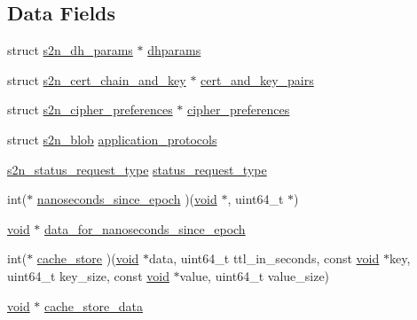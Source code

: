 \subsection*{Data Fields}
\begin{DoxyCompactItemize}
\item 
struct \hyperlink{structs2n__dh__params}{s2n\+\_\+dh\+\_\+params} $\ast$ \hyperlink{structs2n__config_abdbd12d9095df20e7e63ef00b353db7c}{dhparams}
\item 
struct \hyperlink{structs2n__cert__chain__and__key}{s2n\+\_\+cert\+\_\+chain\+\_\+and\+\_\+key} $\ast$ \hyperlink{structs2n__config_acd0d45f80129861144d237591eee6c5f}{cert\+\_\+and\+\_\+key\+\_\+pairs}
\item 
struct \hyperlink{structs2n__cipher__preferences}{s2n\+\_\+cipher\+\_\+preferences} $\ast$ \hyperlink{structs2n__config_a2cdf2a56849d48a020a71d6e8d03d9cf}{cipher\+\_\+preferences}
\item 
struct \hyperlink{structs2n__blob}{s2n\+\_\+blob} \hyperlink{structs2n__config_a45182f90f146494a0f2dc4c962bbba0e}{application\+\_\+protocols}
\item 
\hyperlink{s2n_8h_a7d38e45340d223d0100a2d4bc0526635}{s2n\+\_\+status\+\_\+request\+\_\+type} \hyperlink{structs2n__config_aa6c7e4f4cf13d4d133b66760cf0d09fa}{status\+\_\+request\+\_\+type}
\item 
int($\ast$ \hyperlink{structs2n__config_a5c13684f60b915be42223586e6c42e5c}{nanoseconds\+\_\+since\+\_\+epoch} )(\hyperlink{hw__4758__cca_8h_afad4d591c7931ff6dc5bf69c76c96aa0}{void} $\ast$, uint64\+\_\+t $\ast$)
\item 
\hyperlink{hw__4758__cca_8h_afad4d591c7931ff6dc5bf69c76c96aa0}{void} $\ast$ \hyperlink{structs2n__config_a462e69eaecd0176f077b385c9dd1477b}{data\+\_\+for\+\_\+nanoseconds\+\_\+since\+\_\+epoch}
\item 
int($\ast$ \hyperlink{structs2n__config_a346cfdf0a283437f5de8ae4cf2aeec4e}{cache\+\_\+store} )(\hyperlink{hw__4758__cca_8h_afad4d591c7931ff6dc5bf69c76c96aa0}{void} $\ast$data, uint64\+\_\+t ttl\+\_\+in\+\_\+seconds, const \hyperlink{hw__4758__cca_8h_afad4d591c7931ff6dc5bf69c76c96aa0}{void} $\ast$key, uint64\+\_\+t key\+\_\+size, const \hyperlink{hw__4758__cca_8h_afad4d591c7931ff6dc5bf69c76c96aa0}{void} $\ast$value, uint64\+\_\+t value\+\_\+size)
\item 
\hyperlink{hw__4758__cca_8h_afad4d591c7931ff6dc5bf69c76c96aa0}{void} $\ast$ \hyperlink{structs2n__config_a239fa5479daf6b4ec8ec1247e4d5d594}{cache\+\_\+store\+\_\+data}
\item 

\end{DoxyCompactItemize}
